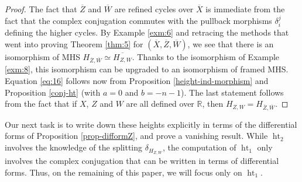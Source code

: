 \documentclass[11pt,a4paper]{amsart}
\newcommand{\R}{\mathds{R}}
\DeclareMathOperator{\Ht}{ht}
\numberwithin{equation}{section}
\theoremstyle{plain}
\theoremstyle{definition}
\begin{document}
\begin{proof}
  The fact that $\overline{Z}$ and $\overline{W}$ are refined cycles
  over $\overline X$ is immediate from the fact that the complex
  conjugation commutes with the pullback morphisms $\delta^{j}_{i}$
  defining the higher cycles. By Example \ref{exm:6} and retracing the
  methods that went into proving Theorem \ref{thm:5} for $(\overline
  X, \overline Z, \overline W)$, we see that there is an isomorphism
  of MHS $H_{\overline
  Z,\overline W}\simeq \overline{H_{Z,W}}$. Thanks to the isomorphism
of Example \ref{exm:8},
this isomorphism can be upgraded to an isomorphism of framed MHS.
Equation \eqref{eq:16} follows now from Proposition
\ref{height-ind-morphism} and Proposition \ref{conj-ht} (with $a=0$
and $b=-n-1$). The last statement follows from the fact that if $X$,
$Z$ and $W$ 
are all defined over $\R$, then $H_{Z,W}=H_{\overline Z,\overline W}$. 
\end{proof}

Our next task is to write down these heights explicitly in terms of
  the differential forms of Proposition \ref{prop-difformZ}, and prove a vanishing result. While $\Ht_{2}$ involves the knowledge of the splitting $\delta_{H_{Z,W}}$, the computation of $\Ht_{1}$ only involves the complex
  conjugation that can be written in terms of differential
  forms. Thus, on the remaining of this paper,  we will focus only on $\Ht_{1}$.
\end{document}
